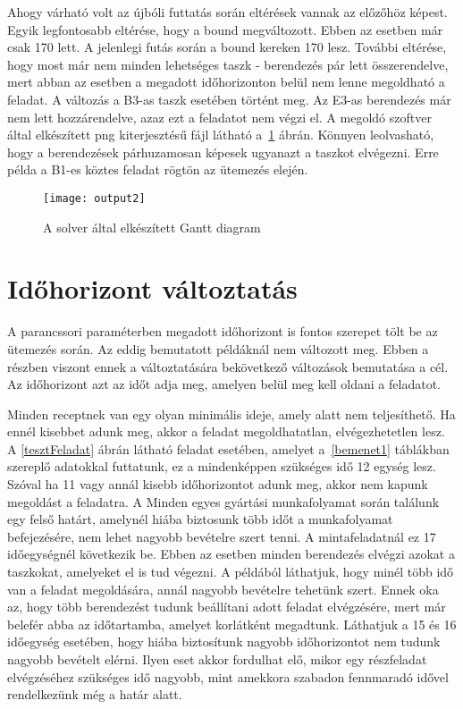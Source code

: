 Ahogy várható volt az újbóli futtatás során eltérések vannak az előzőhöz képest. Egyik legfontosabb eltérése, hogy a bound megváltozott. Ebben az esetben már csak 170 lett. A jelenlegi futás során a bound kereken 170 lesz. További eltérése, hogy most már nem minden lehetséges taszk - berendezés pár lett összerendelve, mert abban az esetben a megadott időhorizonton belül nem lenne megoldható a feladat. A változás a B3-as taszk esetében történt meg. Az E3-as berendezés már nem lett hozzárendelve, azaz ezt a feladatot nem végzi el. A megoldó szoftver által elkészített png kiterjesztésű fájl látható a~\ref{output2} ábrán. Könnyen leolvasható, hogy a berendezések párhuzamosan képesek ugyanazt a taszkot elvégezni. Erre példa a B1-es köztes feladat rögtön az ütemezés elején. 

\begin{figure}[H]
\begin{center}
\texttt{[image: output2]}
\caption{A solver által elkészített Gantt diagram}
\label{output2}
\end{center}
\end{figure}

\section{Időhorizont változtatás}
A parancssori paraméterben megadott időhorizont is fontos szerepet tölt be az ütemezés során. Az eddig bemutatott példáknál nem változott meg. Ebben a részben viszont ennek a változtatására bekövetkező változások bemutatása a cél. Az időhorizont azt az időt adja meg, amelyen belül meg kell oldani a feladatot.

Minden receptnek van egy olyan minimális ideje, amely alatt nem teljesíthető. Ha ennél kisebbet adunk meg, akkor a feladat megoldhatatlan, elvégezhetetlen lesz. A \ref{tesztFeladat} ábrán látható feladat esetében, amelyet a~\ref{bemenet1} táblákban szereplő adatokkal futtatunk, ez a mindenképpen szükséges idő 12 egység lesz. Szóval ha 11 vagy annál kisebb időhorizontot adunk meg, akkor nem kapunk megoldást a feladatra. A Minden egyes gyártási munkafolyamat során találunk egy felső határt, amelynél hiába biztosunk több időt a munkafolyamat befejezésére, nem lehet nagyobb bevételre szert tenni. A mintafeladatnál ez 17 időegységnél következik be. Ebben az esetben minden berendezés elvégzi azokat a taszkokat, amelyeket el is tud végezni. A példából láthatjuk, hogy minél több idő van a feladat megoldására, annál nagyobb bevételre tehetünk szert. Ennek oka az, hogy több berendezést tudunk beállítani adott feladat elvégzésére, mert már belefér abba az időtartamba, amelyet korlátként megadtunk. Láthatjuk a 15 és 16 időegység esetében, hogy hiába biztosítunk nagyobb időhorizontot nem tudunk nagyobb bevételt elérni. Ilyen eset akkor fordulhat elő, mikor egy részfeladat elvégzéséhez szükséges idő nagyobb, mint amekkora szabadon fennmaradó idővel rendelkezünk még a határ alatt.  

